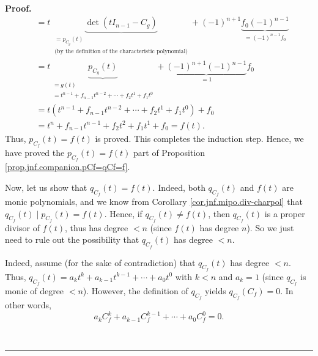 \documentclass[numbers=enddot,12pt,final,onecolumn,notitlepage]{scrartcl}%
\numberwithin{exer}{subsection}
\theoremstyle{definition}
\newenvironment{proof}[1][Proof]{\noindent\textbf{#1.} }{\ \rule{0.5em}{0.5em}}
\begin{document}
\begin{proof}
\begin{align*}
&  =t\ \underbrace{\det\left(  tI_{n-1}-C_{g}\right)  }_{\substack{=p_{C_{g}%
}\left(  t\right)  \\\text{(by the definition of the characteristic
polynomial)}}}+\left(  -1\right)  ^{n+1}\underbrace{f_{0}\left(  -1\right)
^{n-1}}_{=\left(  -1\right)  ^{n-1}f_{0}}\\
&  =t\underbrace{p_{C_{g}}\left(  t\right)  }_{\substack{=g\left(  t\right)
\\=t^{n-1}+f_{n-1}t^{n-2}+\cdots+f_{2}t^{1}+f_{1}t^{0}}}+\underbrace{\left(
-1\right)  ^{n+1}\left(  -1\right)  ^{n-1}}_{=1}f_{0}\\
&  =t\left(  t^{n-1}+f_{n-1}t^{n-2}+\cdots+f_{2}t^{1}+f_{1}t^{0}\right)
+f_{0}\\
&  =t^{n}+f_{n-1}t^{n-1}+f_{2}t^{2}+f_{1}t^{1}+f_{0}=f\left(  t\right)  .
\end{align*}
Thus, $p_{C_{f}}\left(  t\right)  =f\left(  t\right)  $ is proved. This
completes the induction step. Hence, we have proved the $p_{C_{f}}\left(
t\right)  =f\left(  t\right)  $ part of Proposition
\ref{prop.jnf.companion.pCf=qCf=f}.

Now, let us show that $q_{C_{f}}\left(  t\right)  =f\left(  t\right)  $.
Indeed, both $q_{C_{f}}\left(  t\right)  $ and $f\left(  t\right)  $ are monic
polynomials, and we know from Corollary \ref{cor.jnf.mipo.div-charpol} that
$q_{C_{f}}\left(  t\right)  \mid p_{C_{f}}\left(  t\right)  =f\left(
t\right)  $. Hence, if $q_{C_{f}}\left(  t\right)  \neq f\left(  t\right)  $,
then $q_{C_{f}}\left(  t\right)  $ is a proper divisor of $f\left(  t\right)
$, thus has degree $<n$ (since $f\left(  t\right)  $ has degree $n$). So we
just need to rule out the possibility that $q_{C_{f}}\left(  t\right)  $ has
degree $<n$.

Indeed, assume (for the sake of contradiction) that $q_{C_{f}}\left(
t\right)  $ has degree $<n$. Thus, $q_{C_{f}}\left(  t\right)  =a_{k}%
t^{k}+a_{k-1}t^{k-1}+\cdots+a_{0}t^{0}$ with $k<n$ and $a_{k}=1$ (since
$q_{C_{f}}$ is monic of degree $<n$). However, the definition of $q_{C_{f}}$
yields $q_{C_{f}}\left(  C_{f}\right)  =0$. In other words,%
\[
a_{k}C_{f}^{k}+a_{k-1}C_{f}^{k-1}+\cdots+a_{0}C_{f}^{0}=0.
\]



\end{proof}
\end{document}

